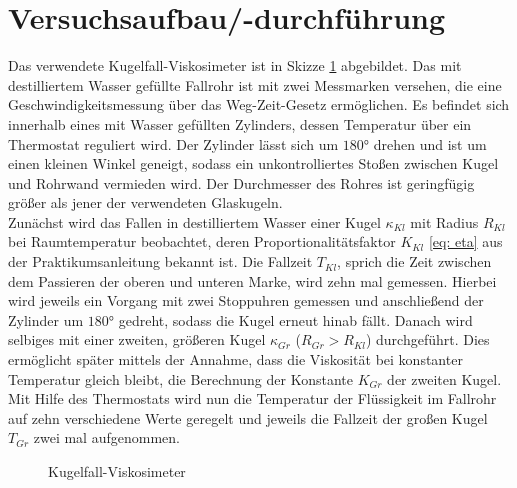 \section{Versuchsaufbau/-durchführung}
Das verwendete Kugelfall-Viskosimeter ist in Skizze \ref{fig: aufbau} abgebildet. Das mit destilliertem Wasser gefüllte Fallrohr ist mit zwei Messmarken versehen, die eine Geschwindigkeitsmessung über das Weg-Zeit-Gesetz ermöglichen.
Es befindet sich innerhalb eines mit Wasser gefüllten Zylinders, dessen Temperatur über ein Thermostat reguliert wird. Der Zylinder lässt sich um $180 \si{\degree}$ drehen und ist
um einen kleinen Winkel geneigt, sodass ein unkontrolliertes Stoßen zwischen Kugel und Rohrwand vermieden wird. Der Durchmesser des Rohres ist geringfügig größer als jener der verwendeten Glaskugeln.\\
Zunächst wird das Fallen in destilliertem Wasser einer Kugel $\kappa_{Kl}$ mit Radius $R_{Kl}$ bei Raumtemperatur beobachtet, deren Proportionalitätsfaktor $K_{Kl}$ \eqref{eq: eta} aus der
Praktikumsanleitung \cite{anleitung207} bekannt ist. Die Fallzeit $T_{Kl}$, sprich die Zeit zwischen dem Passieren der oberen und unteren Marke,
wird zehn mal gemessen. Hierbei wird jeweils ein Vorgang mit zwei Stoppuhren gemessen und anschließend der Zylinder um $180\si{\degree}$ gedreht, sodass die
Kugel erneut hinab fällt. Danach wird selbiges mit einer zweiten, größeren Kugel $\kappa_{Gr}$ ($R_{Gr} > R_{Kl}$) durchgeführt. Dies ermöglicht später
mittels der Annahme, dass die Viskosität bei konstanter Temperatur gleich bleibt, die Berechnung der Konstante $K_{Gr}$ der zweiten Kugel. \\
Mit Hilfe des Thermostats wird nun die Temperatur der Flüssigkeit im Fallrohr auf zehn verschiedene Werte geregelt und jeweils die Fallzeit der großen Kugel $T_{Gr}$ zwei mal aufgenommen.
\begin{figure}
  \centering
  \caption{Kugelfall-Viskosimeter \cite{anleitung207}}
  \label{fig: aufbau}
\end{figure}
